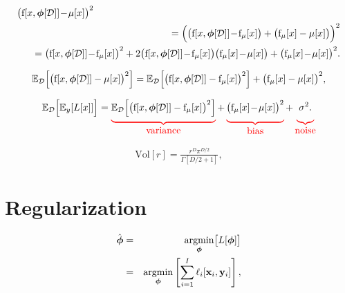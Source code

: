 \documentclass[letterpaper,twoside,openany, titlepage,oldfontcommands,titles,dvipsnames]{memoir}
\newcommand*\mystrut[1]{\vrule width0pt height0pt depth#1\relax}
\begin{document}
\begin{eqnarray}
  \bigl(\mbox{f}[x,\boldsymbol\phi[\mathcal{D}]]\!-\!\mu[x]\bigr)^2 &&\\
  &&\hspace{-2.5cm}=\Bigl(\bigl(\mbox{f}[x,\boldsymbol\phi[\mathcal{D}]]\!-\! \mbox{f}_{\mu}[x]\bigr)+\bigl( \mbox{f}_{\mu}[x]-\mu[x]\bigr)\Bigr)^2 \nonumber \\ 
  &&\hspace{-2.5cm}=\bigl(\mbox{f}[x,\boldsymbol\phi[\mathcal{D}]]\!-\! \mbox{f}_{\mu}[x]\bigr)^2+2\bigl(\mbox{f}[x,\boldsymbol\phi[\mathcal{D}]]\!-\! \mbox{f}_{\mu}[x]\bigr)\bigl(\mbox{f}_{\mu}[x]\!-\!\mu[x]\bigr)+\bigl(\mbox{f}_{\mu}[x]\!-\!\mu[x]\bigr)^2.\nonumber
 \end{eqnarray}

\begin{eqnarray}\label{eq:perf_bv2}
 \mathbb{E}_{\mathcal{D}}\Bigl[\bigl(\mbox{f}[x,\boldsymbol\phi[\mathcal{D}]]-\mu[x]\bigr)^2\Bigr] = \mathbb{E}_\mathcal{D}\Bigl[\bigl(\mbox{f}[x,\boldsymbol\phi[\mathcal{D}]]- \mbox{f}_{\mu}[x]\bigr)^2\Bigr]+\bigl(\mbox{f}_{\mu}[x]-\mu[x]\bigr)^2,
 \end{eqnarray}

\begin{eqnarray}\label{eq:perf_bias_variance_final}
 \mathbb{E}_{\mathcal{D}}\Bigl[\mathbb{E}_{y}[L[x]]\Bigr] = 
 \begingroup\color{red}
  \underbrace{\color{black}\mystrut{2.0ex}\mathbb{E}_\mathcal{D}\Bigl[\bigl(\mbox{f}[x,\boldsymbol\phi[\mathcal{D}]]- \mbox{f}_{\mu}[x]\bigr)^2\Bigr]}_{\mbox{variance}} 
  \endgroup
 +
 \begingroup\color{red}
  \underbrace{\color{black}\mystrut{2.0ex}\bigl(\mbox{f}_{\mu}[x]\!-\!\mu[x]\bigr)^2}_{\mbox{bias}} 
  \endgroup
 +
 \begingroup\color{red}
  \underbrace{\color{black}\mystrut{2.0ex}\sigma^2.}_{\mbox{noise}} 
  \endgroup
 \end{eqnarray}

\begin{eqnarray}
  \mbox{Vol}[r] = \frac{r^{D}\pi^{D/2}}{\Gamma[D/2+1]},
 \end{eqnarray}

\chapter{Regularization}

\begin{eqnarray}
 \hat{\boldsymbol\phi} &=& \mathop{\rm argmin}_{\boldsymbol\phi}\bigl[L[\boldsymbol\phi]\bigr]\nonumber \\
 &=& \mathop{\rm argmin}_{\boldsymbol\phi}\left[\sum_{i=1}^{I}\ell_{i}[\mathbf{x}_{i},\mathbf{y}_{i}]\right],
 \end{eqnarray}
\end{document}
